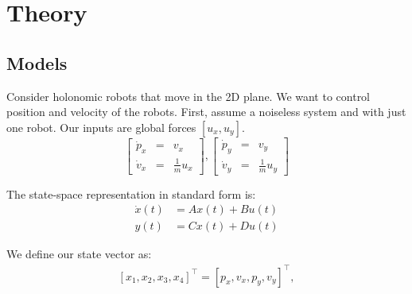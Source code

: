\section{Theory}
\label{sec:theory}


\subsection{Models}
Consider holonomic robots that move in the 2D plane. We want to control position and velocity of the robots. 
First, assume a noiseless system and with just one robot.
 Our inputs are global forces $[u_x,u_y]$. \begin{equation}
\begin{bmatrix}
\dot{p}_x &=& v_x \\
\dot{v}_x &=& \frac{1}{m} u_x
\end{bmatrix},
\begin{bmatrix}
\dot{p}_y &=& v_y \\
\dot{v}_y &=&\frac{1}{m} u_y
\end{bmatrix}
\end{equation}

The state-space representation in standard form is: 
\begin{align}\label{eq:stdform}
\dot{x}(t)  &=  A x(t) + B u(t) \\
y(t) &= C x(t) + D u(t)\nonumber \end{align}


We define our state vector as:
\begin{align}
\left[ x_1,x_2,x_3,x_4\right]^\intercal = \left[ p_x,v_x,p_y,v_y\right]^\intercal, \nonumber
\end{align}

